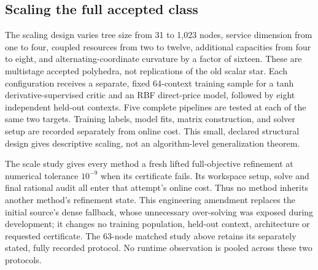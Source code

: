 \documentclass[11pt,letterpaper]{article}
\theoremstyle{definition}
\newcommand{\1}{\mathbf 1}
\begin{document}
\subsection{Scaling the full accepted class}
The scaling design varies tree size from 31 to 1,023 nodes, service dimension from one to four, coupled resources from two to twelve, additional capacities from four to eight, and alternating-coordinate curvature by a factor of sixteen. These are multistage accepted polyhedra, not replications of the old scalar star. Each configuration receives a separate, fixed 64-context training sample for a tanh derivative-supervised critic and an RBF direct-price model, followed by eight independent held-out contexts. Five complete pipelines are tested at each of the same two targets. Training labels, model fits, matrix construction, and solver setup are recorded separately from online cost. This small, declared structural design gives descriptive scaling, not an algorithm-level generalization theorem.

The scale study gives every method a fresh lifted full-objective refinement at numerical tolerance $10^{-9}$ when its certificate fails. Its workspace setup, solve and final rational audit all enter that attempt's online cost. Thus no method inherits another method's refinement state. This engineering amendment replaces the initial source's dense fallback, whose unnecessary over-solving was exposed during development; it changes no training population, held-out context, architecture or requested certificate. The 63-node matched study above retains its separately stated, fully recorded protocol. No runtime observation is pooled across these two protocols.
\end{document}
